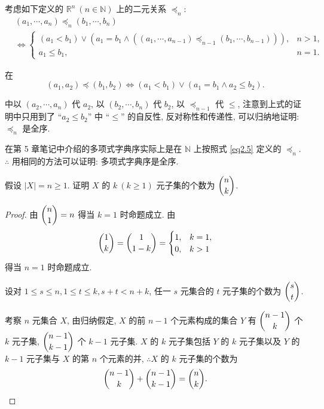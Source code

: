 \documentclass[color=black,device=normal,lang=cn,mode=geye]{elegantnote}
\begin{document}
\begin{note}
    考虑如下定义的 $\mathbb{R}^n\ (n\in\mathbb{N})$ 上的二元关系 $\preceq_n$:
    \begin{equation}\label{eq2.5}
        \begin{aligned}
            & (a_1,\cdots,a_n)\preceq_n(b_1,\cdots,b_n) \\
            & \Leftrightarrow\begin{cases}
                (a_1<b_1)\vee(a_1=b_1\wedge((a_1,\cdots,a_{n-1})\preceq_{n-1}(b_1,\cdots,b_{n-1}))), & n>1, \\
                a_1\leq b_1, & n=1.
            \end{cases}
        \end{aligned}
    \end{equation}

    在
    \[(a_1,a_2)\preceq(b_1,b_2)\Leftrightarrow(a_1<b_1)\vee(a_1=b_1\wedge a_2\leq b_2).\]

    中以 $(a_2,\cdots,a_n)$ 代 $a_2$, 以 $(b_2,\cdots,b_n)$ 代 $b_2$, 以 $\preceq_{n-1}$ 代 $\leq$, 注意到上式的证明中只用到了 ``$a_2\leq b_2$'' 中 ``$\leq$'' 的自反性, 反对称性和传递性, 可以归纳地证明: $\preceq_n$ 是全序.
    
    在第 5 章笔记中介绍的多项式字典序实际上是在 $\mathbb{N}$ 上按照式 \ref{eq2.5} 定义的 $\preceq_n$. $\therefore$ 用相同的方法可以证明: 多项式字典序是全序.
\end{note}
\begin{exercisec}[2.5.1(1)]
    假设 $|X|=n\geq1$. 证明 $X$ 的 $k\ (k\geq1)$ 元子集的个数为 $\dbinom{n}{k}$.
\end{exercisec}
\begin{proof}
    由 $\dbinom{n}{1}=n$ 得当 $k=1$ 时命题成立. 由
    \[\dbinom{1}{k}=\dbinom{1}{1-k}=\begin{cases}
        1, & k=1, \\
        0, & k>1
    \end{cases}\]
    得当 $n=1$ 时命题成立.

    设对 $1\leq s\leq n,1\leq t\leq k,s+t<n+k$, 任一 $s$ 元集合的 $t$ 元子集的个数为 $\dbinom{s}{t}$.
    
    考察 $n$ 元集合 $X$, 由归纳假定, $X$ 的前 $n-1$ 个元素构成的集合 $Y$ 有 $\dbinom{n-1}{k}$ 个 $k$ 元子集, $\dbinom{n-1}{k-1}$ 个 $k-1$ 元子集. $X$ 的 $k$ 元子集包括 $Y$ 的 $k$ 元子集以及 $Y$ 的 $k-1$ 元子集与 $X$ 的第 $n$ 个元素的并, $\therefore X$ 的 $k$ 元子集的个数为
    \[\dbinom{n-1}{k}+\dbinom{n-1}{k-1}=\dbinom{n}{k}.\qedhere\]
\end{proof}
\end{document}
